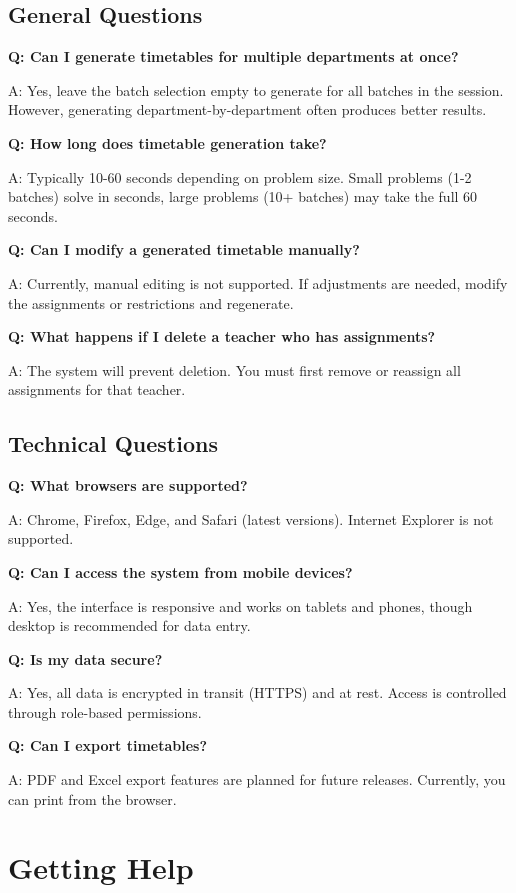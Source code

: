 \documentclass[12pt,a4paper]{article}
\begin{document}
\subsection{General Questions}

\textbf{Q: Can I generate timetables for multiple departments at once?}

A: Yes, leave the batch selection empty to generate for all batches in the session. However, generating department-by-department often produces better results.

\textbf{Q: How long does timetable generation take?}

A: Typically 10-60 seconds depending on problem size. Small problems (1-2 batches) solve in seconds, large problems (10+ batches) may take the full 60 seconds.

\textbf{Q: Can I modify a generated timetable manually?}

A: Currently, manual editing is not supported. If adjustments are needed, modify the assignments or restrictions and regenerate.

\textbf{Q: What happens if I delete a teacher who has assignments?}

A: The system will prevent deletion. You must first remove or reassign all assignments for that teacher.

\subsection{Technical Questions}

\textbf{Q: What browsers are supported?}

A: Chrome, Firefox, Edge, and Safari (latest versions). Internet Explorer is not supported.

\textbf{Q: Can I access the system from mobile devices?}

A: Yes, the interface is responsive and works on tablets and phones, though desktop is recommended for data entry.

\textbf{Q: Is my data secure?}

A: Yes, all data is encrypted in transit (HTTPS) and at rest. Access is controlled through role-based permissions.

\textbf{Q: Can I export timetables?}

A: PDF and Excel export features are planned for future releases. Currently, you can print from the browser.

\section{Getting Help}
\end{document}
